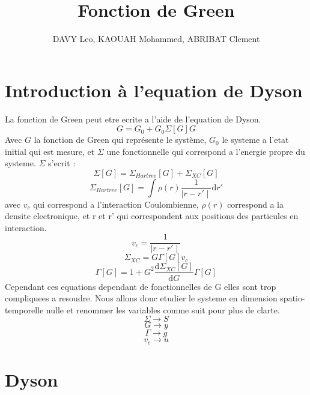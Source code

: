 \documentclass[12pt]{article}
\title{Fonction de Green}
\author{DAVY Leo, KAOUAH Mohammed, ABRIBAT Clement}
\begin{document}
\maketitle
\section{Introduction à l'equation de Dyson}
La fonction de Green peut etre ecrite a l'aide de l'equation de Dyson. 
\begin{equation}
	G = G_0 + G_0 \Sigma[G] G
\end{equation}
Avec $G$ la fonction de Green qui représente le système, $G_0$ le systeme a l'etat initial qui est mesure, et $\Sigma$ une fonctionnelle qui correspond a l'energie propre du systeme.
$\Sigma$ s'ecrit :
\begin{equation}
	\Sigma[G] = \Sigma_{Hartree}[G] + \Sigma_{XC}[G]
\end{equation}
\begin{equation}
	\Sigma_{Hartree}[G] = \int \rho(r) \frac{1}{\mid r - r'\mid }\mathrm{d}r' 
\end{equation}
avec $v_c$ qui correspond a l'interaction Coulombienne, $\rho(r)$ correspond a la densite electronique, et r et r' qui correspondent aux positions des particules en interaction.
\begin{equation}
	v_c =  \frac{1}{\mid r - r'\mid }
\end{equation}
\begin{equation}
	\Sigma_{XC} = G \Gamma[G] v_c
\end{equation}
\begin{equation}
	\Gamma[G] = 1 + G^2 \frac{\mathrm{d} \Sigma_{XC}[G]}{\mathrm{d}G} \Gamma[G]
\end{equation}
Cependant ces equations dependant de fonctionnelles de G elles sont trop compliquees a resoudre. Nous allons donc etudier le systeme en dimension spatio-temporelle nulle et renommer les variables comme suit pour plus de clarte.
\begin{equation}
	\Sigma \longrightarrow S
\end{equation}
\begin{equation}
	G \longrightarrow y
\end{equation}
\begin{equation}
	\Gamma \longrightarrow g
\end{equation}
\begin{equation}
	v_c \longrightarrow u
\end{equation}
\section{Dyson}
\end{document}
